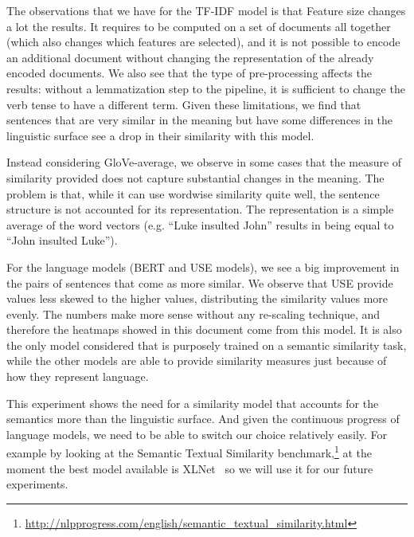 The observations that we have for the TF-IDF model is that
Feature size changes a lot the results.
It requires to be computed on a set of documents all together (which also changes which features are selected), and it is not possible to encode an additional document without changing the representation of the already encoded documents.
We also see that the type of pre-processing affects the results: without a lemmatization step to the pipeline, it is sufficient to change the verb tense to have a different term.
Given these limitations, we find that sentences that are very similar in the meaning but have some differences in the linguistic surface see a drop in their similarity with this model.

Instead considering GloVe-average, we observe in some cases that the measure of similarity provided does not capture substantial changes in the meaning. The problem is that, while it can use wordwise similarity quite well, the sentence structure is not accounted for its representation. The representation is a simple average of the word vectors (e.g. ``Luke insulted John'' results in being equal to ``John insulted Luke'').

For the language models (BERT and USE models), we see a big improvement in the pairs of sentences that come as more similar.
We observe that USE provide values less skewed to the higher values, distributing the similarity values more evenly. The numbers make more sense without any re-scaling technique, and therefore the heatmaps showed in this document come from this model.
It is also the only model considered that is purposely trained on a semantic similarity task, while the other models are able to provide similarity measures just because of how they represent language.



This experiment shows the need for a similarity model that accounts for the semantics more than the linguistic surface. And given the continuous progress of language models, we need to be able to switch our choice relatively easily.
For example by looking at the Semantic Textual Similarity benchmark,\footnote{\url{http://nlpprogress.com/english/semantic_textual_similarity.html}} at the moment the best model available is XLNet~\cite{yang2019xlnet} so we will use it for our future experiments.


